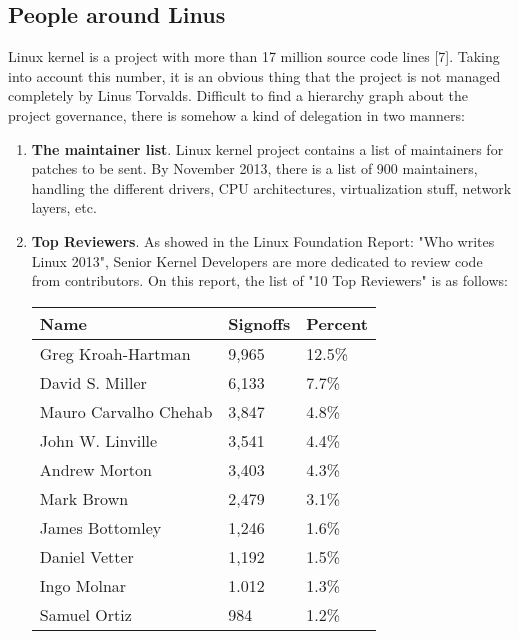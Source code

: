 \documentclass[11pt]{article}
\begin{document}
\subsection{People around Linus}
Linux kernel is a project with more than 17 million source code lines [7]. Taking into account this number, it is an obvious thing that the project is not managed completely by Linus Torvalds. Difficult to find a hierarchy graph about the project governance, there is somehow a kind of delegation in two manners:
\begin{enumerate}
\item{\textbf{The maintainer list}}. Linux kernel project contains a list of maintainers for patches to be sent. By November 2013, there is a list of 900 maintainers, handling the different drivers, CPU architectures, virtualization stuff, network layers, etc.
\item{\textbf{Top Reviewers}}. As showed in the Linux Foundation Report: "Who writes Linux 2013", Senior Kernel Developers are more dedicated to review code from contributors. On this report, the list of "10 Top Reviewers" is as follows:
\begin{center}
    \begin{tabular}{ | l | l | l | }
    \hline
    Name & Signoffs & Percent \\
    \hline
    Greg Kroah-Hartman    & 9,965 & 12.5\%\\
    David S. Miller       & 6,133 &  7.7\%\\ 
    Mauro Carvalho Chehab & 3,847 &  4.8\%\\
    John W. Linville      & 3,541 &  4.4\%\\
    Andrew Morton         & 3,403 &  4.3\%\\
    Mark Brown            & 2,479 &  3.1\%\\
    James Bottomley       & 1,246 &  1.6\%\\
    Daniel Vetter         & 1,192 &  1.5\%\\
    Ingo Molnar           & 1.012 &  1.3\%\\
    Samuel Ortiz          &   984 &  1.2\%\\
    \hline
    \end{tabular}
\end{center}


\end{enumerate}
\end{document}
